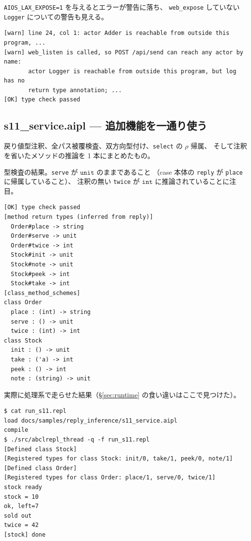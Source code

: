 \documentclass[11pt,a4paper]{ltjsarticle}
\theoremstyle{definition}
\theoremstyle{remark}
\newcommand{\ty}[1]{\ensuremath{\mathtt{#1}}}
\begin{document}
\texttt{AIOS\_LAX\_EXPOSE=1} を与えるとエラーが警告に落ち、
\texttt{web\_expose} していない \texttt{Logger} についての警告も見える。

\begin{lstlisting}[language={}]
[warn] line 24, col 1: actor Adder is reachable from outside this program, ...
[warn] web_listen is called, so POST /api/send can reach any actor by name:
       actor Logger is reachable from outside this program, but log has no
       return type annotation; ...
[OK] type check passed
\end{lstlisting}

\subsection{s11\_service.aipl --- 追加機能を一通り使う}

戻り値型注釈、全パス被覆検査、双方向型付け、\texttt{select} の $\rho$ 帰属、
そして注釈を省いたメソッドの推論を 1 本にまとめたもの。



型検査の結果。\texttt{serve} が \ty{unit} のままであること
（case 本体の \texttt{reply} が \texttt{place} に帰属していること）、
注釈の無い \texttt{twice} が \ty{int} に推論されていることに注目。

\begin{lstlisting}[language={}]
[OK] type check passed
[method return types (inferred from reply)]
  Order#place -> string
  Order#serve -> unit
  Order#twice -> int
  Stock#init -> unit
  Stock#note -> unit
  Stock#peek -> int
  Stock#take -> int
[class_method_schemes]
class Order
  place : (int) -> string
  serve : () -> unit
  twice : (int) -> int
class Stock
  init : () -> unit
  take : ('a) -> int
  peek : () -> int
  note : (string) -> unit
\end{lstlisting}

実際に処理系で走らせた結果（\S\ref{sec:runtime} の食い違いはここで見つけた）。

\begin{lstlisting}[language={}]
$ cat run_s11.repl
load docs/samples/reply_inference/s11_service.aipl
compile
$ ./src/abclrepl_thread -q -f run_s11.repl
[Defined class Stock]
[Registered types for class Stock: init/0, take/1, peek/0, note/1]
[Defined class Order]
[Registered types for class Order: place/1, serve/0, twice/1]
stock ready
stock = 10
ok, left=7
sold out
twice = 42
[stock] done
\end{lstlisting}
\end{document}
